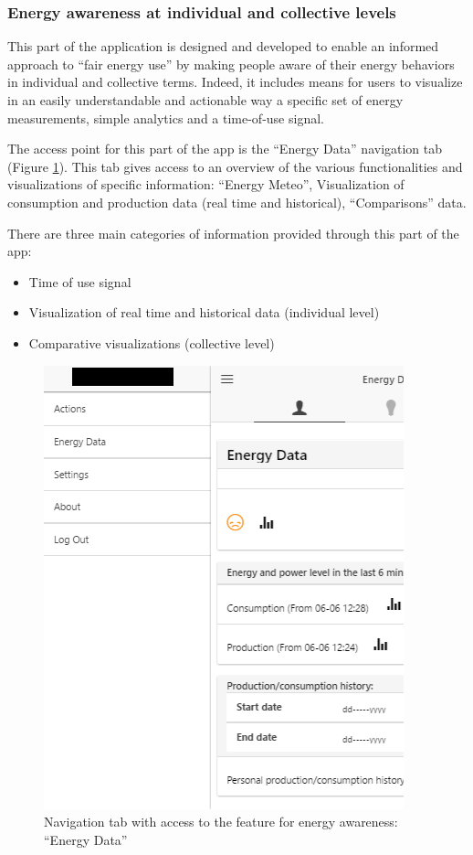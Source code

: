 \subsubsection{Energy awareness at individual and collective levels}\label{sec:energydata}

This part of the application is designed and developed to enable an informed approach to ``fair energy use'' by making people aware of their
energy behaviors in individual and collective terms. Indeed, it includes means for users to visualize in an easily
understandable and actionable way a specific set of energy measurements, simple analytics and a time-of-use signal.

The access point for this part of the app is the ``Energy Data'' navigation tab (Figure \ref{fig:tab}). This tab gives access to an
overview of the various functionalities and visualizations of specific information: ``Energy Meteo'', Visualization of consumption and production data (real time and historical),
``Comparisons'' data.

There are three main categories of information provided through this part of the app:
\begin{itemize}
 \item Time of use signal
 \item Visualization of real time and historical data (individual level)
 \item Comparative visualizations (collective level)
\end{itemize}

\begin{figure}[htb]
\centering
\includegraphics[width=0.33\linewidth]{img/trentinooverview_tab3.png}
\caption{Navigation tab with access to the feature for energy awareness: ``Energy Data''}\label{fig:tab}
\end{figure}

